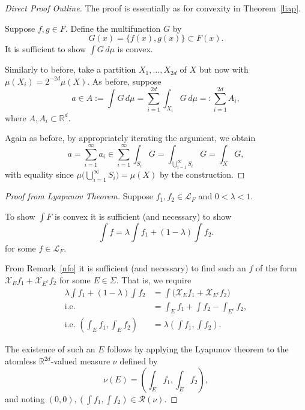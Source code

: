 \documentclass[a4paper]{amsart}
\theoremstyle{plain}
\theoremstyle{definition}
\theoremstyle{remark}
\begin{document}
 \begin{proof}[Direct Proof Outline]  The proof is essentially as for convexity in Theorem~\ref{liap}.
 
 Suppose $ f,g \in F$.  Define the multifunction $ G $ by
 \[
    G(x) = \{ f(x), g(x) \} \subset F(x).
    \]
    It is sufficient to show $ \int G \, d\mu $ is convex.
    
 Similarly to before, take a partition $ X_1,\dots, X_{2d} $ of $ X $ but now with $ \mu(X_i) = 2^{-2d} \mu(X) $. As before, suppose
 \[
 a \in A:= \int G\, d\mu = \sum_{i=1}^{2d}\int_{X_i}G\, d\mu =: \sum_{i=1}^{2d} A_i,
 \]
 where $ A, A_i \subset \mathbb{R}^d  $.
 
Again as before, by appropriately iterating the argument, we obtain
\[
a = \sum_{i=1}^\infty a_i \in \sum_{i=1}^\infty \int_{S_i} G = \int_{\bigcup_{i=1}^\infty S_i} G = \int _X G,
\]
with equality since $ \mu\big(   \bigcup_{i=1}^\infty S_i\big) = \mu(X) $ by the construction.
 \end{proof}

 \begin{proof}[Proof from Lyapunov Theorem]  Suppose $ f_1,f_2 \in \mathcal{L}_F $ and $ 0 < \lambda < 1 $.  
 
 To show $ \int F  $ is convex it is sufficient (and necessary) to show 
 \[
 \int f   = \lambda \int f_1 + (1- \lambda ) \int f_2 .
 \]
 for some $ f \in \mathcal{L} _F $.
 
 From Remark~\ref{nfo} it is sufficient (and necessary) to find such an $ f $ of the form $ 
\mathcal{X} _E f_1 + \mathcal{X} _{E^c} f_2 $ for some $ E \in \Sigma $. 
That is, we require
 \begin{align*}
  \lambda \int f_1 + (1- \lambda ) \int f_2  &=  \int \big( \mathcal{X} _E f_1 + \mathcal{X} _{E^c} f_2  \big) \\
    \text{i.e.\ } &= \int_E f_1 + \int  f_2 - \int_{E^c} f_2 ,   \\
    \text{i.e.\ } \left( \int_E f_1, \int_E f_2\right) &= \lambda \left(\int f_1, \int f_2 \right) .
 \end{align*}
 
 The existence of such an $ E $ follows by applying the Lyapunov theorem to the atomless  $ \mathbb{R}^{2d} $-valued measure $ \nu $ defined by
 \[
 \nu(E) =  \left( \int_E f_1, \int_E f_2\right),
 \]
 and noting $ (0,0), \left(\int f_1, \int f_2 \right) \in \mathcal{R} (\nu) $.
  \end{proof}
 
 
\end{document}
